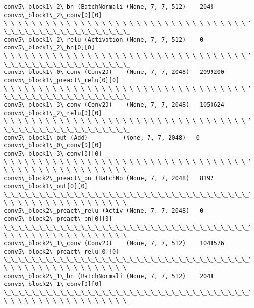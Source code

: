 \documentclass[11pt]{article}
\begin{document}
\begin{Verbatim}[commandchars=\\\{\}]
conv5\_block1\_2\_bn (BatchNormali (None, 7, 7, 512)    2048
conv5\_block1\_2\_conv[0][0]
\_\_\_\_\_\_\_\_\_\_\_\_\_\_\_\_\_\_\_\_\_\_\_\_\_\_\_\_\_\_\_\_\_\_\_\_\_\_\_\_\_\_\_\_\_\_\_\_\_\_\_\_\_\_\_\_\_\_\_\_\_\_\_\_\_\_\_\_\_\_\_\_\_\_\_\_\_\_\_\_
\_\_\_\_\_\_\_\_\_\_\_\_\_\_\_\_\_\_
conv5\_block1\_2\_relu (Activation (None, 7, 7, 512)    0
conv5\_block1\_2\_bn[0][0]
\_\_\_\_\_\_\_\_\_\_\_\_\_\_\_\_\_\_\_\_\_\_\_\_\_\_\_\_\_\_\_\_\_\_\_\_\_\_\_\_\_\_\_\_\_\_\_\_\_\_\_\_\_\_\_\_\_\_\_\_\_\_\_\_\_\_\_\_\_\_\_\_\_\_\_\_\_\_\_\_
\_\_\_\_\_\_\_\_\_\_\_\_\_\_\_\_\_\_
conv5\_block1\_0\_conv (Conv2D)    (None, 7, 7, 2048)   2099200
conv5\_block1\_preact\_relu[0][0]
\_\_\_\_\_\_\_\_\_\_\_\_\_\_\_\_\_\_\_\_\_\_\_\_\_\_\_\_\_\_\_\_\_\_\_\_\_\_\_\_\_\_\_\_\_\_\_\_\_\_\_\_\_\_\_\_\_\_\_\_\_\_\_\_\_\_\_\_\_\_\_\_\_\_\_\_\_\_\_\_
\_\_\_\_\_\_\_\_\_\_\_\_\_\_\_\_\_\_
conv5\_block1\_3\_conv (Conv2D)    (None, 7, 7, 2048)   1050624
conv5\_block1\_2\_relu[0][0]
\_\_\_\_\_\_\_\_\_\_\_\_\_\_\_\_\_\_\_\_\_\_\_\_\_\_\_\_\_\_\_\_\_\_\_\_\_\_\_\_\_\_\_\_\_\_\_\_\_\_\_\_\_\_\_\_\_\_\_\_\_\_\_\_\_\_\_\_\_\_\_\_\_\_\_\_\_\_\_\_
\_\_\_\_\_\_\_\_\_\_\_\_\_\_\_\_\_\_
conv5\_block1\_out (Add)          (None, 7, 7, 2048)   0
conv5\_block1\_0\_conv[0][0]
conv5\_block1\_3\_conv[0][0]
\_\_\_\_\_\_\_\_\_\_\_\_\_\_\_\_\_\_\_\_\_\_\_\_\_\_\_\_\_\_\_\_\_\_\_\_\_\_\_\_\_\_\_\_\_\_\_\_\_\_\_\_\_\_\_\_\_\_\_\_\_\_\_\_\_\_\_\_\_\_\_\_\_\_\_\_\_\_\_\_
\_\_\_\_\_\_\_\_\_\_\_\_\_\_\_\_\_\_
conv5\_block2\_preact\_bn (BatchNo (None, 7, 7, 2048)   8192
conv5\_block1\_out[0][0]
\_\_\_\_\_\_\_\_\_\_\_\_\_\_\_\_\_\_\_\_\_\_\_\_\_\_\_\_\_\_\_\_\_\_\_\_\_\_\_\_\_\_\_\_\_\_\_\_\_\_\_\_\_\_\_\_\_\_\_\_\_\_\_\_\_\_\_\_\_\_\_\_\_\_\_\_\_\_\_\_
\_\_\_\_\_\_\_\_\_\_\_\_\_\_\_\_\_\_
conv5\_block2\_preact\_relu (Activ (None, 7, 7, 2048)   0
conv5\_block2\_preact\_bn[0][0]
\_\_\_\_\_\_\_\_\_\_\_\_\_\_\_\_\_\_\_\_\_\_\_\_\_\_\_\_\_\_\_\_\_\_\_\_\_\_\_\_\_\_\_\_\_\_\_\_\_\_\_\_\_\_\_\_\_\_\_\_\_\_\_\_\_\_\_\_\_\_\_\_\_\_\_\_\_\_\_\_
\_\_\_\_\_\_\_\_\_\_\_\_\_\_\_\_\_\_
conv5\_block2\_1\_conv (Conv2D)    (None, 7, 7, 512)    1048576
conv5\_block2\_preact\_relu[0][0]
\_\_\_\_\_\_\_\_\_\_\_\_\_\_\_\_\_\_\_\_\_\_\_\_\_\_\_\_\_\_\_\_\_\_\_\_\_\_\_\_\_\_\_\_\_\_\_\_\_\_\_\_\_\_\_\_\_\_\_\_\_\_\_\_\_\_\_\_\_\_\_\_\_\_\_\_\_\_\_\_
\_\_\_\_\_\_\_\_\_\_\_\_\_\_\_\_\_\_
conv5\_block2\_1\_bn (BatchNormali (None, 7, 7, 512)    2048
conv5\_block2\_1\_conv[0][0]
\_\_\_\_\_\_\_\_\_\_\_\_\_\_\_\_\_\_\_\_\_\_\_\_\_\_\_\_\_\_\_\_\_\_\_\_\_\_\_\_\_\_\_\_\_\_\_\_\_\_\_\_\_\_\_\_\_\_\_\_\_\_\_\_\_\_\_\_\_\_\_\_\_\_\_\_\_\_\_\_
\_\_\_\_\_\_\_\_\_\_\_\_\_\_\_\_\_\_

\end{Verbatim}
\end{document}
